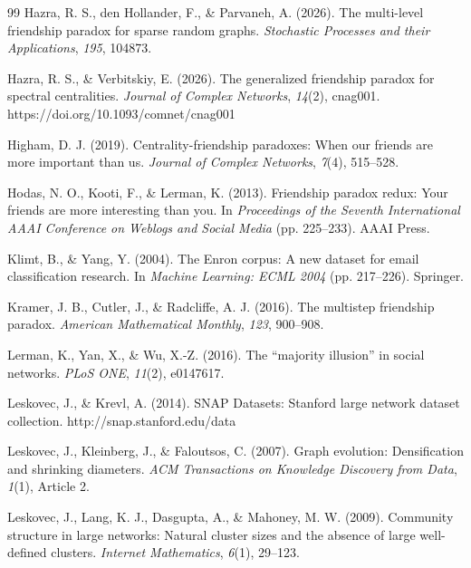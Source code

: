 \documentclass{nws}
\begin{document}
\begin{thebibliography}{99}
 Hazra, R. S.,
den Hollander, F., \& Parvaneh, A. (2026). The multi-level friendship
paradox for sparse random graphs. \emph{Stochastic Processes and their
Applications}, \emph{195}, 104873.

 Hazra, R. S., \&
Verbitskiy, E. (2026). The generalized friendship paradox for spectral
centralities. \emph{Journal of Complex Networks}, \emph{14}(2), cnag001. https://doi.org/10.1093/comnet/cnag001

 Higham, D. J. (2019).
Centrality-friendship paradoxes: When our friends are more important than
us. \emph{Journal of Complex Networks}, \emph{7}(4), 515--528.

 Hodas, N. O., Kooti, F.,
\& Lerman, K. (2013). Friendship paradox redux: Your friends are more
interesting than you. In \emph{Proceedings of the Seventh International
AAAI Conference on Weblogs and Social Media} (pp. 225--233). AAAI Press.

 Klimt, B., \& Yang, Y. (2004). The Enron corpus: A new dataset for email classification research. In \emph{Machine Learning: ECML 2004} (pp. 217--226). Springer.

 Kramer, J. B.,
Cutler, J., \& Radcliffe, A. J. (2016). The multistep friendship paradox.
\emph{American Mathematical Monthly}, \emph{123}, 900--908.

 Lerman, K., Yan, X., \& Wu,
X.-Z. (2016). The ``majority illusion'' in social networks. \emph{PLoS
ONE}, \emph{11}(2), e0147617.

 Leskovec, J., \& Krevl, A. (2014). SNAP Datasets: Stanford large network dataset collection. http://snap.stanford.edu/data

 Leskovec, J., Kleinberg, J., \& Faloutsos, C. (2007). Graph evolution: Densification and shrinking diameters. \emph{ACM Transactions on Knowledge Discovery from Data}, \emph{1}(1), Article 2.

 Leskovec, J., Lang, K. J., Dasgupta, A., \& Mahoney, M. W. (2009). Community structure in large networks: Natural cluster sizes and the absence of large well-defined clusters. \emph{Internet Mathematics}, \emph{6}(1), 29--123.


\end{thebibliography}
\end{document}
